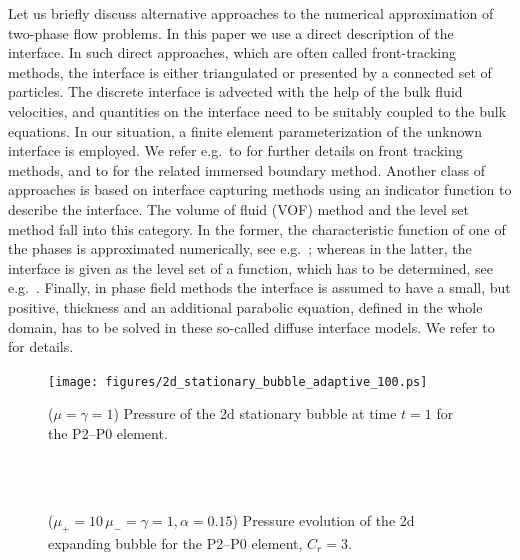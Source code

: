 \documentclass[a4paper,12pt,onecolumn]{article}
\begin{document}
Let us briefly discuss alternative approaches to the numerical approximation of
two-phase flow problems. In this paper we use a direct description of the
interface.  In such direct
approaches, which are often called front-tracking methods, the interface is
either triangulated or presented by a connected set of particles. The discrete
interface is advected with the help of the bulk fluid velocities, and
quantities on the interface need to be suitably coupled to the bulk equations.
In our situation, a finite element parameterization of the unknown interface
is employed.
We refer e.g.\ to
\cite{UnverdiT92,Bansch01,Tryggvason_etal01,GanesanMT07,GanesanT08,spurious}
for further details on front tracking methods,
and to \cite{LevequeL97,Peskin02} for the related immersed
boundary method. Another class of approaches is based on interface capturing
methods using an indicator function to describe the interface. The volume of
fluid (VOF) method and the level set method fall into this category. In the
former, the characteristic function of one of the phases is approximated
numerically, see e.g.\ \cite{HirtN81,RenardyR02,Popinet09}; whereas in the
latter, the interface is given as the level set of a function, which has to be
determined, see e.g.\ \cite{SussmanSO94,Sethian99,OsherF03,GrossR07}.
Finally, in phase
field methods the interface is assumed to have a small, but positive, thickness
and an additional parabolic equation, defined in the whole domain, has to be
solved in these so-called diffuse interface models. We refer to
\cite{HohenbergH77,AndersonMW98,LowengrubT98,Feng06,KaySW08,AbelsGG12,GrunK14}
for details.

\begin{figure}[htbp]
\centering
\texttt{[image: figures/2d\_stationary\_bubble\_adaptive\_100.ps]}
\caption{($\mu=\gamma=1$) Pressure of the 2d stationary bubble at time $t=1$
for the P2--P0 element.}
\end{figure}

\begin{figure}[htbp]
  \centering
  \\
  \\
\caption{($\mu_+ = 10\,\mu_- = \gamma = 1,\alpha = 0.15$) Pressure evolution of
the 2d expanding bubble for the P2--P0 element, $C_r=3$.}
\end{figure}
\end{document}
